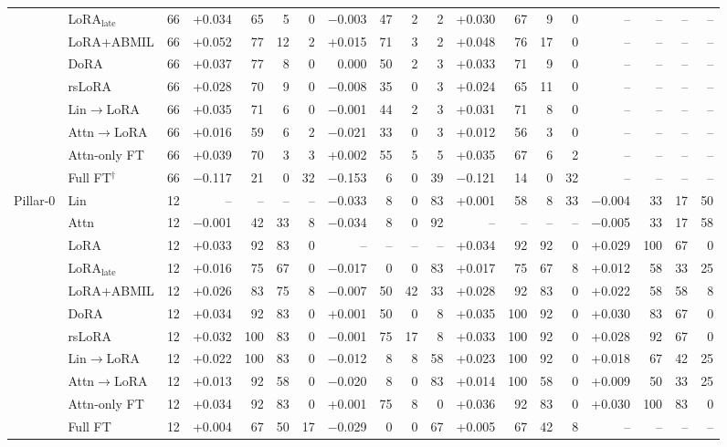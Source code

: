 \begin{tabular}{@{}llrrrrrrrrrrrrrrrrr@{}}
 & LoRA$_{\text{late}}$ & 66 & +0.034 & 65 & 5 & 0 & $-$0.003 & 47 & 2 & 2 & +0.030 & 67 & 9 & 0 & -- & -- & -- & -- \\
 & LoRA+ABMIL & 66 & +0.052 & 77 & 12 & 2 & +0.015 & 71 & 3 & 2 & +0.048 & 76 & 17 & 0 & -- & -- & -- & -- \\
 & DoRA & 66 & +0.037 & 77 & 8 & 0 & 0.000 & 50 & 2 & 3 & +0.033 & 71 & 9 & 0 & -- & -- & -- & -- \\
 & rsLoRA & 66 & +0.028 & 70 & 9 & 0 & $-$0.008 & 35 & 0 & 3 & +0.024 & 65 & 11 & 0 & -- & -- & -- & -- \\
 & Lin$\to$LoRA & 66 & +0.035 & 71 & 6 & 0 & $-$0.001 & 44 & 2 & 3 & +0.031 & 71 & 8 & 0 & -- & -- & -- & -- \\
 & Attn$\to$LoRA & 66 & +0.016 & 59 & 6 & 2 & $-$0.021 & 33 & 0 & 3 & +0.012 & 56 & 3 & 0 & -- & -- & -- & -- \\
 & Attn-only FT & 66 & +0.039 & 70 & 3 & 3 & +0.002 & 55 & 5 & 5 & +0.035 & 67 & 6 & 2 & -- & -- & -- & -- \\
 & Full FT$^{\dagger}$ & 66 & $-$0.117 & 21 & 0 & 32 & $-$0.153 & 6 & 0 & 39 & $-$0.121 & 14 & 0 & 32 & -- & -- & -- & -- \\
\addlinespace
Pillar-0 & Lin & 12 & -- & -- & -- & -- & $-$0.033 & 8 & 0 & 83 & +0.001 & 58 & 8 & 33 & $-$0.004 & 33 & 17 & 50 \\
 & Attn & 12 & $-$0.001 & 42 & 33 & 8 & $-$0.034 & 8 & 0 & 92 & -- & -- & -- & -- & $-$0.005 & 33 & 17 & 58 \\
 & LoRA & 12 & +0.033 & 92 & 83 & 0 & -- & -- & -- & -- & +0.034 & 92 & 92 & 0 & +0.029 & 100 & 67 & 0 \\
 & LoRA$_{\text{late}}$ & 12 & +0.016 & 75 & 67 & 0 & $-$0.017 & 0 & 0 & 83 & +0.017 & 75 & 67 & 8 & +0.012 & 58 & 33 & 25 \\
 & LoRA+ABMIL & 12 & +0.026 & 83 & 75 & 8 & $-$0.007 & 50 & 42 & 33 & +0.028 & 92 & 83 & 0 & +0.022 & 58 & 58 & 8 \\
 & DoRA & 12 & +0.034 & 92 & 83 & 0 & +0.001 & 50 & 0 & 8 & +0.035 & 100 & 92 & 0 & +0.030 & 83 & 67 & 0 \\
 & rsLoRA & 12 & +0.032 & 100 & 83 & 0 & $-$0.001 & 75 & 17 & 8 & +0.033 & 100 & 92 & 0 & +0.028 & 92 & 67 & 0 \\
 & Lin$\to$LoRA & 12 & +0.022 & 100 & 83 & 0 & $-$0.012 & 8 & 8 & 58 & +0.023 & 100 & 92 & 0 & +0.018 & 67 & 42 & 25 \\
 & Attn$\to$LoRA & 12 & +0.013 & 92 & 58 & 0 & $-$0.020 & 8 & 0 & 83 & +0.014 & 100 & 58 & 0 & +0.009 & 50 & 33 & 25 \\
 & Attn-only FT & 12 & +0.034 & 92 & 83 & 0 & +0.001 & 75 & 8 & 0 & +0.036 & 92 & 83 & 0 & +0.030 & 100 & 83 & 0 \\
 & Full FT & 12 & +0.004 & 67 & 50 & 17 & $-$0.029 & 0 & 0 & 67 & +0.005 & 67 & 42 & 8 & -- & -- & -- & -- \\
\bottomrule
\end{tabular}
